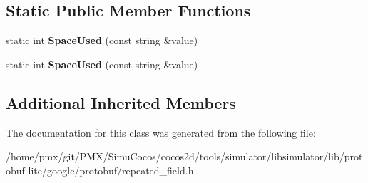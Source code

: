 \subsection*{Static Public Member Functions}
\begin{DoxyCompactItemize}
\item 
\mbox{\label{classgoogle_1_1protobuf_1_1internal_1_1StringTypeHandler_a1605d857ae02016096dad237aaa2e652}} 
static int {\bfseries Space\+Used} (const string \&value)
\item 
\mbox{\label{classgoogle_1_1protobuf_1_1internal_1_1StringTypeHandler_a1605d857ae02016096dad237aaa2e652}} 
static int {\bfseries Space\+Used} (const string \&value)
\end{DoxyCompactItemize}
\subsection*{Additional Inherited Members}


The documentation for this class was generated from the following file\+:\begin{DoxyCompactItemize}
\item 
/home/pmx/git/\+P\+M\+X/\+Simu\+Cocos/cocos2d/tools/simulator/libsimulator/lib/protobuf-\/lite/google/protobuf/repeated\+\_\+field.\+h\end{DoxyCompactItemize}
